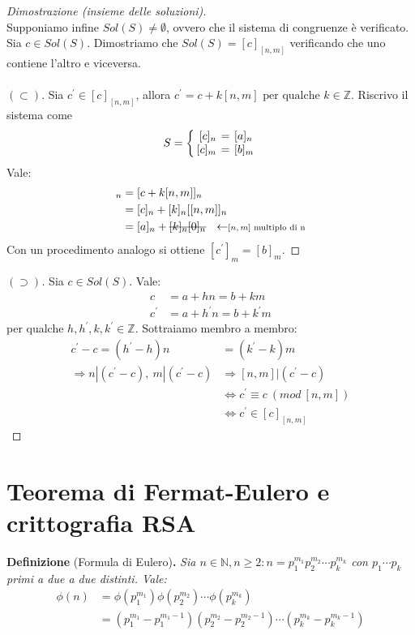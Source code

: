 \documentclass[12pt,twoside]{article}
\newcommand{\N}{\mathbb{N}}
\newcommand{\Z}{\mathbb{Z}}
\newcommand{\sesolose}{\Leftrightarrow}
\newcommand{\implica}{\Longrightarrow}
\newcommand{\pr}{\prime}
\newcommand{\pq}{\text{ per qualche }}
\renewcommand\qedsymbol{$\blacksquare$}
\newcommand{\stkout}[1]{\ifmmode\text{\sout{\ensuremath{#1}}}\else\sout{#1}\fi}
\begin{document}
\begin{proof}[Dimostrazione (insieme delle soluzioni)]\ \\
Supponiamo infine $Sol(S) \ne \emptyset$, ovvero che il sistema di congruenze è verificato. Sia $c \in Sol(S)$. Dimostriamo che $Sol(S) = [c]_{[n,m]}$ verificando che uno contiene l'altro e viceversa.
\\\\$(\subset)$.
Sia $ c^{\pr} \in [c]_{[n,m]}$, allora $c^{\pr} = c + k[n,m] \pq k \in \Z$. Riscrivo il sistema come
\[
S = \left\{
\setlength\arraycolsep{2pt}
\begin{array}{rcl} [c]_n & = & [a]_n \\ \relax
 [c]_m & = & [b]_m
\end{array}\right
.
\]
Vale:
\begin{align*}
[c^{\pr}]_n &= [c + k[n,m]]_n \\ 
&= [c]_n + [k]_n [[n,m]]_n \\
&= [a]_n + \stkout{[k]_n [0]_n} \ \ \leftarrow\scriptstyle{ \text{$[n,m]$ multiplo di n}}
\end{align*}
Con un procedimento analogo si ottiene $[c^{\pr}]_m = [b]_m$.
\end{proof}
\renewcommand\qedsymbol{$\blacksquare$}
\begin{proof}[$(\supset)$]
Sia $c \in Sol(S)$. Vale:
\begin{align*}
c &= a+hn = b + km \\
c^{\pr} &= a+h^{\pr}n = b + k^{\pr}m
\end{align*}
per qualche $h, h^{\pr}, k, k^{\pr} \in \Z$. Sottraiamo membro a membro:
\begin{align*}
c^{\pr} - c = (h^{\pr} - h)n &= (k^{\pr} - k)m \\
\implica n | (c^{\pr} -c),\ m|(c^{\pr} - c) &\implica [n, m]|(c^{\pr} - c) \\
&\sesolose c^{\pr} \equiv c \ (mod \ [n, m]) \\
&\sesolose c^{\pr} \in [c]_{[n,m]}
\end{align*}
\end{proof}

\section{Teorema di Fermat-Eulero e crittografia RSA}
\textbf{Definizione} (Formula di Eulero)\textbf{.} \textit{Sia $n \in \N, n \ge 2: n = p^{m_1}_1 p^{m_2}_2 \cdots p^{m_k}_k$ con $p_1 \cdots p_k$ primi a due a due distinti. Vale:
\begin{align*}
\phi(n) &= \phi(p^{m_1}_1)\phi(p^{m_2}_2) \cdots \phi(p^{m_k}_k) \\
&= (p^{m_1}_1 - p^{m_1 - 1}_1) (p^{m_2}_2 - p^{m_2 - 1}_2) \cdots (p^{m_k}_k - p^{m_k - 1}_k)
\end{align*}
}
\end{document}
